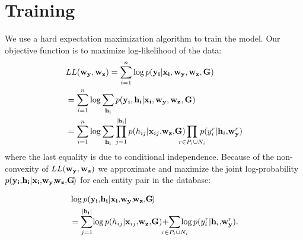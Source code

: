 \documentclass[11pt]{article}
\begin{document}
\section{Training}

We use a hard expectation maximization algorithm to train the model. 
Our objective function is to maximize log-likelihood of the data:
\begin{align*}
&LL({\bf w_y, w_z}) = \sum_{i=1}^n \log p({\bf y_i|x_i, w_y, w_z, G})\\
&=  \sum_{i=1}^n\log \sum_{\bf h_i}  p({\bf y_i, h_i | x_i, w_y, w_z, G})\\
&= \sum_{i=1}^n\log \sum_{\bf h_i}
\prod_{j=1}^{|{\bf h_i}|}  p(h_{ij} |{\bf x}_{ij},\! {\bf w_z}, \!{\bf G})\!\!\!\!\!\!
       \prod_{r\in P_i\cup N_i}\!\! \!\!\!p(y_i^r  |{\bf h}_i, \!{\bf w}_{\bf y}^r)
\end{align*}
where the last equality is due to conditional independence.
Because of the non-convexity of $LL({\bf w_y, w_z})$ we approximate and maximize the joint log-probability $p({\bf y_i,\! h_i | x_i,\! w_y,\!\! w_z,\! G}\!)$ for each entity pair in the database:

\begin{align*}
&\log p({\bf y_i,\! h_i | x_i,\! w_y,\!\! w_z,\! G}\!)  \\
&=\sum_{j=1}^{|{\bf h_i}|}\!   \log   p(h_{ij} |{\bf x}_{ij}, \! {\bf w_z, \!G})\! +\!\!\!\!\!\!\!
       \sum_{r\in P_i\cup N_i}\!\!\!\! \!\!\log p(y_i^r  |{\bf h}_i,\! {\bf w}_{\bf y}^r). 
 \end{align*}
 
\end{document}
